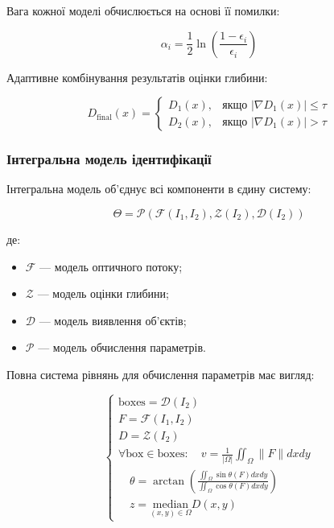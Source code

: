\documentclass[14pt, a4paper]{extarticle}
\numberwithin{equation}{section}
\begin{document}
Вага кожної моделі обчислюється на основі її помилки:

\begin{equation}
\alpha_i = \frac{1}{2} \ln\left( \frac{1 - \epsilon_i}{\epsilon_i} \right) \tag{48}
\end{equation}

Адаптивне комбінування результатів оцінки глибини:

\begin{equation}
\boxed{D_{\text{final}}(x) = \begin{cases} 
D_1(x), & \text{якщо } |\nabla D_1(x)| \leq \tau \\ 
D_2(x), & \text{якщо } |\nabla D_1(x)| > \tau 
\end{cases}} \tag{49}
\end{equation}

\subsubsection{Інтегральна модель ідентифікації}

Інтегральна модель об'єднує всі компоненти в єдину систему:

\begin{equation}
\boxed{\Theta = \mathcal{P}\left(\mathcal{F}(I_1,I_2), \mathcal{Z}(I_2), \mathcal{D}(I_2)\right)} \tag{50}
\end{equation}

де:
\begin{itemize}
\item $\mathcal{F}$ — модель оптичного потоку;
\item $\mathcal{Z}$ — модель оцінки глибини;
\item $\mathcal{D}$ — модель виявлення об'єктів;
\item $\mathcal{P}$ — модель обчислення параметрів.
\end{itemize}

Повна система рівнянь для обчислення параметрів має вигляд:

\begin{equation}
\begin{cases}
\text{boxes} = \mathcal{D}(I_2) \\
F = \mathcal{F}(I_1, I_2) \\
D = \mathcal{Z}(I_2) \\
\forall \text{box} \in \text{boxes}: \quad v = \frac{1}{|\Omega|} \iint_{\Omega} \|F\| dxdy \\
\quad \theta = \arctan\left(\frac{\iint_{\Omega} \sin\theta(F) dxdy}{\iint_{\Omega} \cos\theta(F) dxdy}\right) \\
\quad z = \underset{(x,y)\in\Omega}{\text{median}} D(x,y)
\end{cases} \tag{51}
\end{equation}
\end{document}

